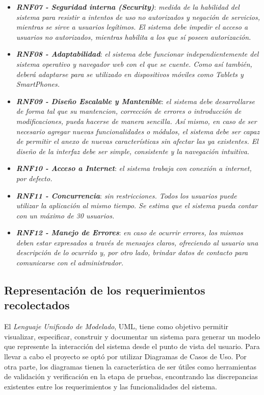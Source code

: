 \documentclass[11pt,oneside]{book}
\begin{document}
\begin{itemize}
\item \textit{\textbf{RNF07 - Seguridad interna (Security)}}: \textit{medida de la habilidad del sistema para resistir a intentos de uso no autorizados y negación de servicios, mientras se sirve a usuarios legítimos. El sistema debe impedir el acceso a usuarios no autorizados, mientras habilita a los que sí poseen autorización.} %

\item \textit{\textbf{RNF08 - Adaptabilidad}}: \textit{el sistema debe funcionar independientemente del sistema operativo y navegador web con el que se cuente. Como así también, deberá adaptarse para se utilizado en dispositivos móviles como Tablets y SmartPhones.}

\item \textit{\textbf{RNF09 - Diseño Escalable y Mantenible}}: \textit{el sistema debe desarrollarse de forma tal que su mantencion, corrección de errores o introducción de modificaciones, pueda hacerse de manera sencilla. Así mismo, en caso de ser necesario agregar nuevas funcionalidades o módulos, el sistema debe ser capaz de permitir el anexo de nuevas características sin afectar las ya existentes. El diseño de la interfaz debe ser simple, consistente y la navegación intuitiva.}

\item \textit{\textbf{RNF10 - Acceso a Internet}}: \textit{el sistema trabaja con conexión a internet, por defecto.}

\item \textit{\textbf{RNF11 - Concurrencia}}: \textit{sin restricciones. Todos los usuarios puede utilizar la aplicación al mismo tiempo. Se estima que el sistema pueda contar con un máximo de 30 usuarios.}

\item \textit{\textbf{RNF12 - Manejo de Errores}}: \textit{en caso de ocurrir errores, los mismos deben estar expresados a través de mensajes claros, ofreciendo al usuario una descripción de lo ocurrido y, por otro lado, brindar datos de contacto para comunicarse con el administrador.}
\end{itemize}

\subsection{Representación de los requerimientos recolectados}
El \textit{Lenguaje Unificado de Modelado}, UML, tiene como objetivo permitir visualizar, especificar, construir y documentar un sistema para generar un modelo que represente la interacción del sistema desde el punto de vista del usuario. Para llevar a cabo el proyecto se optó por utilizar Diagramas de Casos de Uso. Por otra parte, los diagramas tienen la característica de ser útiles como herramientas de validación y verificación en la etapa de pruebas, encontrando las discrepancias existentes entre los requerimientos y las funcionalidades del sistema.
\end{document}
